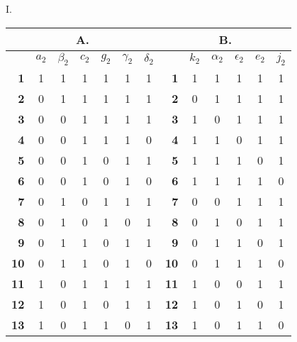 \documentclass[oneside]{article}
\begin{document}
\begin{center}
\large I. \normalsize

\smallskip
\begin{tabular}{|r|c|c|c|c|c|c||r|c|c|c|c|c|}
\multicolumn{7}{c}{A.}&\multicolumn{6}{c}{B.} \\ \hline
           &$a_2$&$\beta_2$&$c_2$&$g_2$&$\gamma_2$&$\delta_2$&           &$k_2$&$\alpha_2$&$\epsilon_2$&$e_2$&$j_2$ \\ \hline
\textbf{ 1}&  1  &    1    &  1  &  1  &    1     &     1    &\textbf{ 1}&  1  &     1    &      1     &  1  &  1   \\ \hline
\textbf{ 2}&  0  &    1    &  1  &  1  &    1     &     1    &\textbf{ 2}&  0  &     1    &      1     &  1  &  1   \\ \hline
\textbf{ 3}&  0  &    0    &  1  &  1  &    1     &     1    &\textbf{ 3}&  1  &     0    &      1     &  1  &  1   \\ \hline
\textbf{ 4}&  0  &    0    &  1  &  1  &    1     &     0    &\textbf{ 4}&  1  &     1    &      0     &  1  &  1   \\ \hline
\textbf{ 5}&  0  &    0    &  1  &  0  &    1     &     1    &\textbf{ 5}&  1  &     1    &      1     &  0  &  1   \\ \hline
\textbf{ 6}&  0  &    0    &  1  &  0  &    1     &     0    &\textbf{ 6}&  1  &     1    &      1     &  1  &  0   \\ \hline
\textbf{ 7}&  0  &    1    &  0  &  1  &    1     &     1    &\textbf{ 7}&  0  &     0    &      1     &  1  &  1   \\ \hline
\textbf{ 8}&  0  &    1    &  0  &  1  &    0     &     1    &\textbf{ 8}&  0  &     1    &      0     &  1  &  1   \\ \hline
\textbf{ 9}&  0  &    1    &  1  &  0  &    1     &     1    &\textbf{ 9}&  0  &     1    &      1     &  0  &  1   \\ \hline
\textbf{10}&  0  &    1    &  1  &  0  &    1     &     0    &\textbf{10}&  0  &     1    &      1     &  1  &  0   \\ \hline
\textbf{11}&  1  &    0    &  1  &  1  &    1     &     1    &\textbf{11}&  1  &     0    &      0     &  1  &  1   \\ \hline
\textbf{12}&  1  &    0    &  1  &  0  &    1     &     1    &\textbf{12}&  1  &     0    &      1     &  0  &  1   \\ \hline
\textbf{13}&  1  &    0    &  1  &  1  &    0     &     1    &\textbf{13}&  1  &     0    &      1     &  1  &  0   \\ \hline

\end{tabular}
\end{center}
\end{document}
